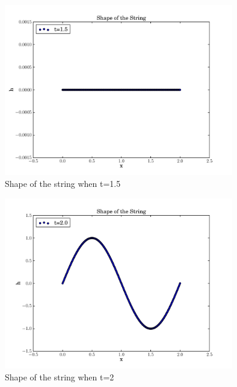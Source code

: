 \documentclass[11pt]{article}
\begin{document}
\begin{figure}[htb]
	\centering
	\includegraphics[width=10cm]{t=1_5.pdf}       
	\caption{Shape of the string when t=1.5}
\end{figure}

\begin{figure}[htb]
	\centering
	\includegraphics[width=10cm]{t=2.pdf}       
	\caption{Shape of the string when t=2}
\end{figure}
\end{document}

